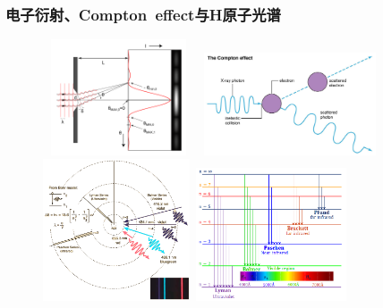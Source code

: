 \frame
{
	\frametitle{电子衍射、\textrm{Compton~effect}与\textrm{H}原子光谱}
\begin{figure}[h!]
\centering
\vspace{-15.5pt}
\includegraphics[height=1.35in,width=1.80in,viewport=0 0 680 600,clip]{Figures/Single_Slit_Diffraction.png}
\includegraphics[height=1.20in,width=2.10in,viewport=0 0 1600 950,clip]{Figures/Compton_effect.jpg}\\
\includegraphics[height=1.65in,width=1.75in,viewport=0 0 620 600,clip]{Figures/Hydrogen_spectrum-3.png}
\includegraphics[height=1.55in,width=1.75in,viewport=0 0 500 380,clip]{Figures/Hydrogen_spectrum-2.png}
\label{electron:wave_and_particle}
\end{figure}
}

